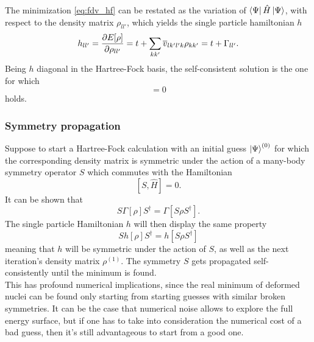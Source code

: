 The minimization \ref{eq:fdv_hf} can be restated as the variation of $\bra{\Psi}\hat H \ket{\Psi}$, with respect to the density matrix $\rho_{ll'}$, which yields the single particle hamiltonian $h$
\begin{equation}
    \label{eq:spe_scnd}
    h_{ll'} = \pdv{E[\rho]}{\rho_{ll'}} = t + \sum_{kk'}\overline{v}_{lk'l'k}\rho_{kk'} = t+\Gamma_{ll'}.
\end{equation}
Being $h$ diagonal in the Hartree-Fock basis, the self-consistent solution is the one for which
\begin{equation}
    [h, \rho] = 0
\end{equation}
holds.
\subsubsection{Symmetry propagation}
Suppose to start a Hartree-Fock calculation with an initial guess $\ket{\Psi}^{(0)}$ for which the corresponding density matrix is symmetric under the action of a many-body symmetry operator $S$ which commutes with the Hamiltonian
\begin{equation}
    \label{eq:comm_S_H}
    [S, \hat H] = 0.
\end{equation}
It can be shown \cite{ring2004nuclear} that 
\begin{equation}
    \label{eq:comm_S_Gamma}
    S\Gamma[\rho] S^\dagger  = \Gamma[S\rho S^\dagger].
\end{equation}
The single particle Hamiltonian $h$ will then display the same property
\begin{equation}
    \label{eq:comm_h_S}
    S h[\rho] S^\dagger = h[S\rho S^\dagger]
\end{equation}
meaning that $h$ will be symmetric under the action of $S$, as well as the next iteration's density matrix $\rho^{(1)}$. The symmetry $S$ gets propagated self-consistently until the minimum is found.
\\This has profound numerical implications, since the real minimum of deformed nuclei can be found only starting from starting guesses with similar broken symmetries. It can be the case that numerical noise allows to explore the full energy surface, but if one has to take into consideration the numerical cost of a bad guess, then it's still advantageous to start from a good one.
